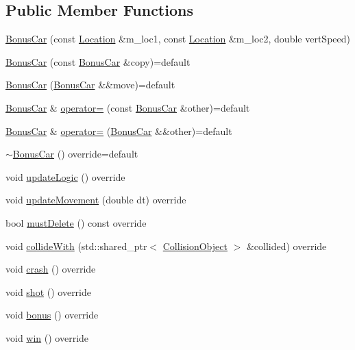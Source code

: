 \subsection*{Public Member Functions}
\begin{DoxyCompactItemize}
\item 
\hyperlink{classroadfighter_1_1BonusCar_ac759d2c4005dab4bc923cf8e08f50115}{Bonus\+Car} (const \hyperlink{classroadfighter_1_1Location}{Location} \&m\+\_\+loc1, const \hyperlink{classroadfighter_1_1Location}{Location} \&m\+\_\+loc2, double vert\+Speed)
\item 
\hyperlink{classroadfighter_1_1BonusCar_ae0308526b0386e16442bbfdd291f3c29}{Bonus\+Car} (const \hyperlink{classroadfighter_1_1BonusCar}{Bonus\+Car} \&copy)=default
\item 
\hyperlink{classroadfighter_1_1BonusCar_a52b06b6ce44208f2df0e0679193008fa}{Bonus\+Car} (\hyperlink{classroadfighter_1_1BonusCar}{Bonus\+Car} \&\&move)=default
\item 
\hyperlink{classroadfighter_1_1BonusCar}{Bonus\+Car} \& \hyperlink{classroadfighter_1_1BonusCar_acd5303a50571433116089c1f63ab0a9e}{operator=} (const \hyperlink{classroadfighter_1_1BonusCar}{Bonus\+Car} \&other)=default
\item 
\hyperlink{classroadfighter_1_1BonusCar}{Bonus\+Car} \& \hyperlink{classroadfighter_1_1BonusCar_a9fd4f5d8559cd48aa408ff032b92c9f4}{operator=} (\hyperlink{classroadfighter_1_1BonusCar}{Bonus\+Car} \&\&other)=default
\item 
\hyperlink{classroadfighter_1_1BonusCar_a055742bdc09217d56c34c7f582cf7670}{$\sim$\+Bonus\+Car} () override=default
\item 
void \hyperlink{classroadfighter_1_1BonusCar_a21d55ad1e1595ac6c86ca20f8819778b}{update\+Logic} () override
\item 
void \hyperlink{classroadfighter_1_1BonusCar_a2d3d584ca34a5df3b3c833123a9bbc30}{update\+Movement} (double dt) override
\item 
bool \hyperlink{classroadfighter_1_1BonusCar_a19d01e92134634a82ae53f0d017956aa}{must\+Delete} () const override
\item 
void \hyperlink{classroadfighter_1_1BonusCar_ad1ce65b53e5652eac482a7b00c9a1d51}{collide\+With} (std\+::shared\+\_\+ptr$<$ \hyperlink{classroadfighter_1_1CollisionObject}{Collision\+Object} $>$ \&collided) override
\item 
void \hyperlink{classroadfighter_1_1BonusCar_aad0a2a41a1b84c6487c1fc204b5f7cb7}{crash} () override
\item 
void \hyperlink{classroadfighter_1_1BonusCar_a02edcd22a86c1f98642c3703ef8dfb16}{shot} () override
\item 
void \hyperlink{classroadfighter_1_1BonusCar_a3d2d15df036c419cd9ad4fbc6fcd4ad9}{bonus} () override
\item 
void \hyperlink{classroadfighter_1_1BonusCar_afb2d142de799694db896ba875d7d0c27}{win} () override
\end{DoxyCompactItemize}


